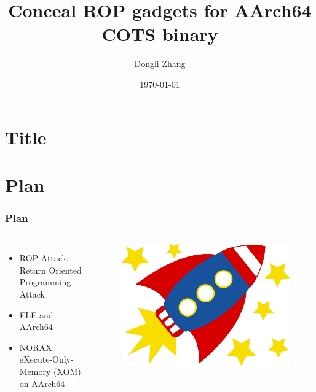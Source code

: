 \documentclass[aspectratio=169]{beamer}
\title[Conceal ROP gadgets for AArch64 COTS binary]{Conceal ROP gadgets for AArch64 COTS binary} %
\author{Dongli Zhang} %
\institute[Oracle] %
{
Oracle Asia Research and Development Centers (Beijing) \\ %
\medskip
\textit{dongli.zhang@oracle.com} %
}
\date{\today} %
\begin{document}

\section{Title}
\begin{frame}
\titlepage %
\end{frame}


\section{Plan}
\begin{frame}
\frametitle{Plan}
\begin{columns}[c]
\begin{itemize}
\setlength\itemsep{1em}
\item {\large ROP Attack: Return Oriented Programming Attack}
\item {\large ELF and AArch64}
\item {\large NORAX: eXecute-Only-Memory (XOM) on AArch64}
\end{itemize}
\begin{center}
\begin{figure}
\includegraphics[width=.8\linewidth]{figures/projects.pdf}
\end{figure}
\end{center}
\end{columns}
\end{frame}

\end{document}
